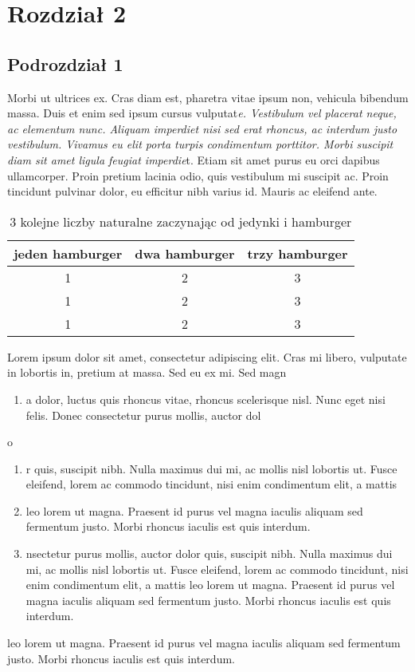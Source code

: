 \documentclass[12pt,a4paper]{article}
\begin{document}
\section{Rozdział 2}
\subsection{Podrozdział 1}
	Morbi ut ultrices ex. Cras diam est, pharetra vitae ipsum non, vehicula bibendum massa. Duis et enim sed ipsum cursus vulputat\textit{e. Vestibulum vel placerat neque, ac elementum nunc. Aliquam imperdiet nisi sed erat rhoncus, ac interdum justo vestibulum. Vivamus eu elit porta turpis condimentum porttitor. Morbi suscipit diam sit amet ligula feugiat imperdie}t. Etiam sit amet purus eu orci dapibus ullamcorper. Proin pretium lacinia odio, quis vestibulum mi suscipit ac. Proin tincidunt pulvinar dolor, eu efficitur nibh varius id. Mauris ac eleifend ante.
	\begin{table}[H]
		\centering
		\begin{tabular}{|c c c|} 
			\hline
			jeden hamburger & dwa hamburger & trzy hamburger \\
			\hline\hline
			1 & 2 & 3  \\ 
			\hline
			1 & 2 & 3  \\
			\hline
			1 & 2 & 3 \\ 
			\hline
		\end{tabular}
  \label{tabela}
	\caption{3 kolejne liczby naturalne zaczynając od jedynki i hamburger}
	\end{table}
	Lorem ipsum dolor sit amet, consectetur adipiscing elit. Cras mi libero, vulputate in lobortis in, pretium at massa. Sed eu ex mi. Sed magn
\begin{enumerate}
\item a dolor, luctus quis rhoncus vitae, rhoncus scelerisque nisl. Nunc eget nisi felis. Donec consectetur purus mollis, auctor dol
\end{enumerate}
o
\begin{enumerate}
\item r quis, suscipit nibh. Nulla maximus dui mi, ac mollis nisl lobortis ut. Fusce eleifend, lorem ac commodo tincidunt, nisi enim condimentum elit, a mattis
\item leo lorem ut magna. Praesent id purus vel magna iaculis aliquam sed fermentum justo. Morbi rhoncus iaculis est quis interdum.
\item nsectetur purus mollis, auctor dolor quis, suscipit nibh. Nulla maximus dui mi, ac mollis nisl lobortis ut. Fusce eleifend, lorem ac commodo tincidunt, nisi enim condimentum elit, a mattis leo lorem ut magna. Praesent id purus vel magna iaculis aliquam sed fermentum justo. Morbi rhoncus iaculis est quis interdum.
\end{enumerate}
 leo lorem ut magna. Praesent id purus vel magna iaculis aliquam sed fermentum justo. Morbi rhoncus iaculis est quis interdum.
\end{document}
